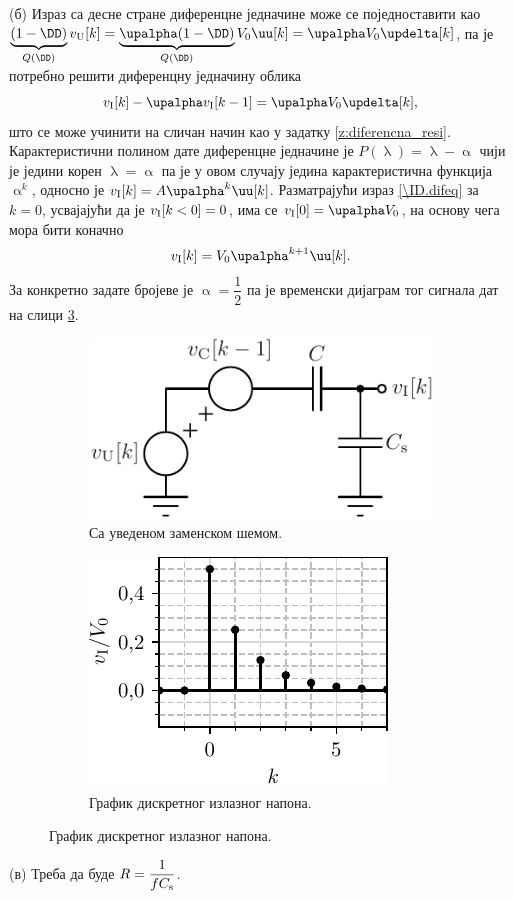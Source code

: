 (б) Израз са десне стране диференцне једначине може се поједноставити као 
$\underbrace{(1 - \DD)}_{Q(\DD)} v_{\rm U}[k] = \underbrace{\upalpha(1 - \DD)}_{Q(\DD)} V_0 \uu[k] =\upalpha V_0 \updelta[k]$, па је потребно 
решити диференцну једначину облика
\begin{equation}
    v_{\rm I}[k] - \upalpha v_{\rm I}[k-1] = \upalpha V_0 \updelta[k], \label{\ID.difeq}
\end{equation}
што се може учинити на сличан начин као у задатку \ref{z:diferencna_resi}. Карактеристични полином дате диференцне једначине је 
$P(\uplambda) = \uplambda - \upalpha$ чији је једини корен $\uplambda = \upalpha$ па је у овом случају једина карактеристична 
функција $\upalpha^k$,  односно је $v_{\rm I}[k] = A \upalpha^k \uu[k]$. Разматрајући израз \eqref{\ID.difeq} за $k=0$, усвајајући
да је $v_{\rm I}[k < 0] = 0$, има се $v_{\rm I}[0] = \upalpha V_0$, на основу чега мора бити коначно
\begin{equation}
    v_{\rm I}[k] = V_0 \upalpha^{k+1} \uu[k]. 
\end{equation}
За конкретно задате бројеве је $\upalpha = \dfrac{1}{2}$ па је временски дијаграм тог сигнала дат на слици 
\ref{\ID.fig.b}.

\begin{figure}
    \begin{subfigure}{0.49\textwidth}
        \centering
        \includegraphics[scale=1]{fig/sc-sol.pdf}
        \caption{Са уведеном заменском шемом.}
        \label{\ID.zam_sch}
    \end{subfigure}
    \begin{subfigure}{0.49\textwidth}
        \centering
        \includegraphics[scale=1]{fig/sc_plot.pdf}
        \caption{График дискретног излазног напона.}
        \label{\ID.fig.b}
    \end{subfigure}
\end{figure}

(в) Треба да буде $R = \dfrac{1}{fC_{\rm s}}$.